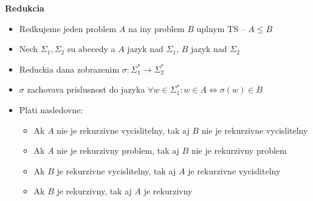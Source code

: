 \documentclass[12pt]{article}
\begin{document}
\textbf{Redukcia}
\begin{itemize}
	\item Redkujeme jeden problem $A$ na iny problem $B$ uplnym TS -- $A \le B$
	\item Nech $\Sigma_{1}, \Sigma_{2}$ su abecedy a $A$ jazyk nad $\Sigma_{1}$, $B$ jazyk nad $\Sigma_{2}$
	\item Reduckia dana zobrazenim $\sigma: \Sigma_{1}^{*} \to \Sigma_{2}^{*}$
	\item $\sigma$ zachovava prislusnost do jazyka $\forall w \in \Sigma_{1}^{*}: w \in A \Leftrightarrow \sigma(w) \in B$
	\item Plati nasledovne:
		\begin{itemize}
			\item Ak $A$ nie je rekurzivne vycislitelny, tak aj $B$ nie je rekurzivne vycislitelny
			\item Ak $A$ nie je rekurzivny problem, tak aj $B$ nie je rekurzivny problem
			\item Ak $B$ je rekurzivne vycislitelny, tak aj $A$ je rekurzivne vycislitelny
			\item Ak $B$ je rekurzivny, tak aj $A$ je rekurzivny
		\end{itemize}
\end{itemize}
\end{document}
